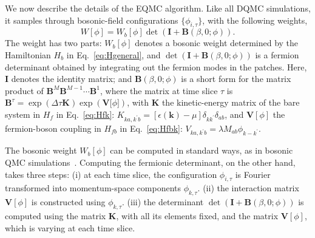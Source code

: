 \documentclass[aps,prx,twocolumn,superscriptaddress,showpacs,floatfix]{revtex4-1}
\begin{document}
We now describe the details of the EQMC algorithm. Like all DQMC simulations, it samples through bosonic-field configurations $\{\phi_{i,\tau}\}$, with the following weights,
\begin{equation}
  \label{eq:Wphi}
  W[\phi] = W_b[\phi]\det(\mathbf I + \mathbf B(\beta,0;\phi)).
\end{equation}
The weight has two parts: $W_b[\phi]$ denotes a bosonic weight determined by the Hamiltonian $H_b$ in Eq.~\eqref{eq:Hgeneral}, and $\det(\mathbf I + \mathbf B(\beta,0;\phi))$ is a fermion determinant obtained by integrating out the fermion modes in the patches.
Here, $\mathbf I$ denotes the identity matrix; and $\mathbf B(\beta, 0;\phi)$ is a short form for the matrix product of $\mathbf{B}^M \mathbf{B}^{M-1} \cdots \mathbf{B}^1$,  where the matrix at time slice $\tau$ is $\mathbf{B}^\tau = \exp({\Delta \tau \mathbf{K}})\exp({\mathbf{V}[\phi}])$, with $\mathbf{K}$ the kinetic-energy matrix of the bare system in $H_f$ in Eq.~\eqref{eq:Hfk}:
$K_{ka,k^\prime b} = [\epsilon(\bm k)-\mu]\delta_{kk^\prime}\delta_{ab}$, and $\mathbf{V}[\phi]$ the fermion-boson coupling in $H_{fb}$ in Eq.~\eqref{eq:Hfbk}: $V_{ka,k^\prime b}=\lambda M_{ab}\phi_{k-k^\prime}$.

The bosonic weight $W_b[\phi]$ can be computed in standard ways, as in bosonic QMC simulations~\cite{YCWang2017}.
Computing the fermionic determinant, on the other hand, takes three steps:
(i) at each time slice, the configuration $\phi_{i,\tau}$ is Fourier transformed into momentum-space components $\phi_{k,\tau}$.
(ii) the interaction matrix $\mathbf{V}[\phi]$ is constructed using $\phi_{k,\tau}$.
(iii) the determinant $\det(\mathbf I + \mathbf B(\beta,0;\phi))$ is computed using the matrix $\mathbf{K}$, with all its elements fixed, and the matrix $\mathbf{V}[\phi]$, which is varying at each time slice.
\end{document}
